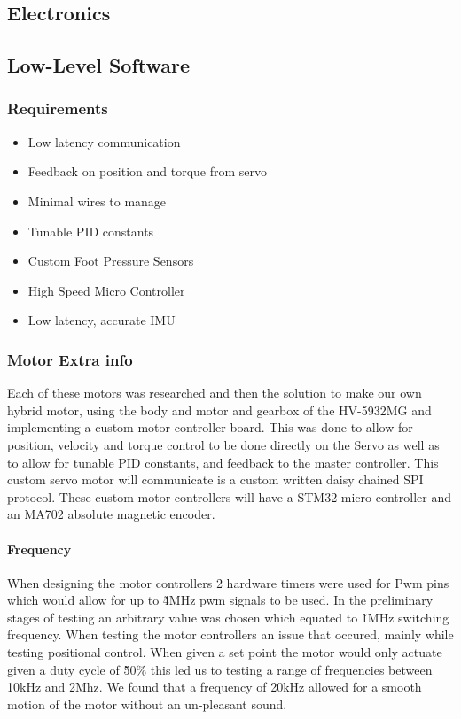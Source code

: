     \subsection{Electronics}


    \subsection{Low-Level Software}
    \subsubsection{Requirements}
    \begin{itemize} %
        \item Low latency communication
        \item Feedback on position and torque from servo
        \item Minimal wires to manage
        \item Tunable PID constants
        \item Custom Foot Pressure Sensors
        \item High Speed Micro Controller
        \item Low latency, accurate IMU
    \end{itemize}

\subsubsection{Motor Extra info}
 Each of these motors was researched and then the solution to make our own hybrid motor, using the body and motor and gearbox of the HV-5932MG and implementing a custom motor controller board. This was done to allow for position, velocity and torque control to be done directly on the Servo as well as to allow for tunable PID constants, and feedback to the master controller. This custom servo motor will communicate is a custom written daisy chained SPI protocol. These custom motor controllers will have a STM32 micro controller and an MA702 absolute magnetic encoder\cite{MA702}.
\paragraph{Frequency}
When designing the motor controllers 2 hardware timers were used for Pwm pins which would allow for up to \~4MHz pwm signals to be used. In the preliminary stages of testing an arbitrary value was chosen which equated to \~1MHz switching frequency. When testing the motor controllers an issue that occured, mainly while testing positional control. When given a set point the motor would only actuate given a duty cycle of  \~50\% this led us to testing a range of frequencies between 10kHz and 2Mhz. We found that a frequency of 20kHz allowed for a smooth motion of the motor without an un-pleasant sound.  
